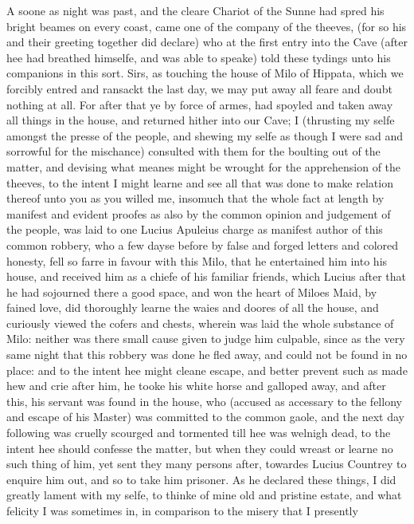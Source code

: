 A soone as night was past, and the cleare Chariot of the Sunne had spred his
bright beames on every coast, came one of the company of the theeves, (for so
his and their greeting together did declare) who at the first entry into the
Cave (after hee had breathed himselfe, and was able to speake) told these
tydings unto his companions in this sort. Sirs, as touching the house of Milo
of Hippata, which we forcibly entred and ransackt the last day, we may put away
all feare and doubt nothing at all. For after that ye by force of armes, had
spoyled and taken away all things in the house, and returned hither into our
Cave; I (thrusting my selfe amongst the presse of the people, and shewing my
selfe as though I were sad and sorrowful for the mischance) consulted with them
for the boulting out of the matter, and devising what meanes might be wrought
for the apprehension of the theeves, to the intent I might learne and see all
that was done to make relation thereof unto you as you willed me, insomuch that
the whole fact at length by manifest and evident proofes as also by the common
opinion and judgement of the people, was laid to one Lucius Apuleius charge as
manifest author of this common robbery, who a few dayse before by false and
forged letters and colored honesty, fell so farre in favour with this Milo,
that he entertained him into his house, and received him as a chiefe of his
familiar friends, which Lucius after that he had sojourned there a good space,
and won the heart of Miloes Maid, by fained love, did thoroughly learne the
waies and doores of all the house, and curiously viewed the cofers and chests,
wherein was laid the whole substance of Milo: neither was there small cause
given to judge him culpable, since as the very same night that this robbery was
done he fled away, and could not be found in no place: and to the intent hee
might cleane escape, and better prevent such as made hew and crie after him, he
tooke his white horse and galloped away, and after this, his servant was found
in the house, who (accused as accessary to the fellony and escape of his
Master) was committed to the common gaole, and the next day following was
cruelly scourged and tormented till hee was welnigh dead, to the intent hee
should confesse the matter, but when they could wreast or learne no such thing
of him, yet sent they many persons after, towardes Lucius Countrey to enquire
him out, and so to take him prisoner. As he declared these things, I did
greatly lament with my selfe, to thinke of mine old and pristine estate, and
what felicity I was sometimes in, in comparison to the misery that I presently
